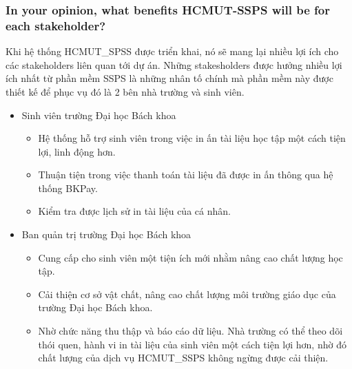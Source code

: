     \subsubsection{In your opinion, what benefits HCMUT-SSPS will be for each stakeholder?}   
	Khi hệ thống HCMUT\_SPSS được triển khai, nó sẽ mang lại nhiều lợi ích cho các stakeholders liên quan tới dự án. Những stakesholders được hưởng nhiều lợi ích nhất từ phần mềm SSPS là những nhân tố chính mà phần mềm này được thiết kế để phục vụ đó là 2 bên nhà trường và sinh viên.
    \begin{itemize}
        \item Sinh viên trường Đại học Bách khoa
            \begin{itemize}
                \item Hệ thống hỗ trợ sinh viên trong việc in ấn tài liệu học tập một cách tiện lợi, linh động hơn.
                \item Thuận tiện trong việc thanh toán tài liệu đã được in ấn thông qua hệ thống BKPay.
                \item Kiểm tra được lịch sử in tài liệu của cá nhân.
            \end{itemize}
        \item Ban quản trị trường Đại học Bách khoa
            \begin{itemize}
                \item Cung cấp cho sinh viên một tiện ích mới nhằm nâng cao chất lượng học tập.
                \item Cải thiện cơ sở vật chất, nâng cao chất lượng môi trường giáo dục của trường Đại học Bách khoa.
                \item Nhờ chức năng thu thập và báo cáo dữ liệu. Nhà trường có thể theo dõi thói quen, hành vi in tài liệu của sinh viên một cách tiện lợi hơn, nhờ đó chất lượng của dịch vụ HCMUT\_SSPS không ngừng được cải thiện.
            \end{itemize}
    \end{itemize}